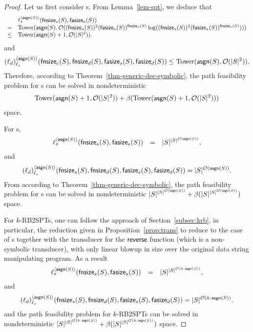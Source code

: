 \begin{proof}
Let us first consider \SSPT{}s. From Lemma~\ref{lem-spt}, we deduce that 
{\small
$$
\begin{array}{l l}
& \ell_s^{\langle \mathsf{asgn}(S) \rangle}(\mathsf{fnsize}_s(S), \mathsf{fasize}_s(S)) \\
=& \mathrm{Tower}(\mathsf{asgn}(S), \mathcal{O}((\mathsf{fnsize}_s(S))^2 (\mathsf{fasize}_s(S))^{\mathsf{fnsize}_s(S)} \log ((\mathsf{fnsize}_s(S))^2 (\mathsf{fasize}_s(S))^{\mathsf{fnsize}_s(S)}) )) \\ 
\le &  \mathrm{Tower}(\mathsf{asgn}(S)+1, \mathcal{O}(|S|^2)).
\end{array}
$$
}
and
$$
(\ell_d)^{\langle \mathsf{asgn}(S) \rangle}_{\ell_s}(\mathsf{fnsize}_c(S), \mathsf{fnsize}_d(S), \mathsf{fasize}_s(S), \mathsf{fasize}_d(S)) \\
\le  \mathrm{Tower}(\mathsf{asgn}(S), \mathcal{O}(|S|^2)).
$$
Therefore, according to Theorem~\ref{thm-generic-dec-symbolic},  the path feasibility problem for \SSPT{}s can be solved in nondeterministic 
$$\mathrm{Tower}(\mathsf{asgn}(S)+1, \mathcal{O}(|S|^2)) + \beta(\mathrm{Tower}(\mathsf{asgn}(S)+1, \mathcal{O}(|S|^2)))$$
 space.
 
 For \SPT{}s, 
 $$
\begin{array}{l c l}
\ell_s^{\langle \mathsf{asgn}(S) \rangle}(\mathsf{fnsize}_s(S), \mathsf{fasize}_s(S)) &=& |S|^{|S|^{\mathcal{O}(\mathsf{asgn}(S))}},
\end{array}
$$
and
$$
(\ell_d)^{\langle \mathsf{asgn}(S) \rangle}_{\ell_s}(\mathsf{fnsize}_s(S), \mathsf{fnsize}_d(S), \mathsf{fasize}_s(S), \mathsf{fasize}_d(S)) = |S|^{\mathcal{O}(\mathsf{asgn}(S))}.
$$
From according to Theorem~\ref{thm-generic-dec-symbolic}, the path feasibility problem for \SPT{}s can be solved in nondeterministic 
$|S|^{|S|^{\mathcal{O}(\mathsf{asgn}(S))}} + \beta(|S|^{|S|^{\mathcal{O}(\mathsf{asgn}(S))}})$
space.

 For $k$-RB2SPTs, one can follow the approach of Section~\ref{subsec:krb}, in particular, the reduction given in Proposition~\ref{prop:trans} to reduce to the case of  \SPT{}s together with the transducer for the ${\sf reverse}$ function (which is a non-symbolic transducer), with only linear blowup in size over the original data string manipulating program. As a result  
$$
\begin{array}{l c l}
\ell_s^{\langle \mathsf{asgn}(S) \rangle}(\mathsf{fnsize}_s(S), \mathsf{fasize}_s(S)) &=& |S|^{|S|^{\mathcal{O}(k\cdot \mathsf{asgn}(S))}},
\end{array}
$$
and
$$
(\ell_d)^{\langle \mathsf{asgn}(S) \rangle}_{\ell_s}(\mathsf{fnsize}_s(S), \mathsf{fnsize}_d(S), \mathsf{fasize}_s(S), \mathsf{fasize}_d(S)) = |S|^{\mathcal{O}(k\cdot \mathsf{asgn}(S))}.
$$
and the path feasibility problem for  $k$-RB2SPTs can be solved in nondeterministic 
$|S|^{|S|^{\mathcal{O}(k\cdot \mathsf{asgn}(S))}} + \beta(|S|^{|S|^{\mathcal{O}(k\cdot \mathsf{asgn}(S))}})$
space.
\end{proof}

